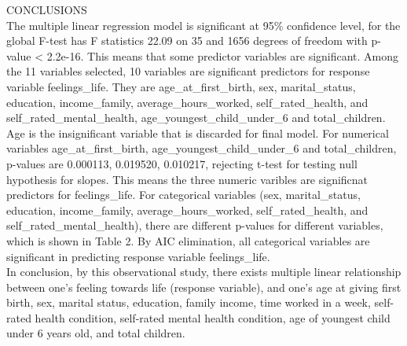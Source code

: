 \documentclass[
]{article}
\begin{document}
CONCLUSIONS\\
The multiple linear regression model is significant at 95\% confidence
level, for the global F-test has F statistics 22.09 on 35 and 1656
degrees of freedom with p-value \textless{} 2.2e-16. This means that
some predictor variables are significant. Among the 11 variables
selected, 10 variables are significant predictors for response variable
feelings\_life. They are age\_at\_first\_birth, sex, marital\_status,
education, income\_family, average\_hours\_worked, self\_rated\_health,
and self\_rated\_mental\_health, age\_youngest\_child\_under\_6 and
total\_children. Age is the insignificant variable that is discarded for
final model. For numerical variables age\_at\_first\_birth,
age\_youngest\_child\_under\_6 and total\_children, p-values are
0.000113, 0.019520, 0.010217, rejecting t-test for testing null
hypothesis for slopes. This means the three numeric varibles are
significnat predictors for feelings\_life. For categorical variables
(sex, marital\_status, education, income\_family,
average\_hours\_worked, self\_rated\_health, and
self\_rated\_mental\_health), there are different p-values for different
variables, which is shown in Table 2. By AIC elimination, all
categorical variables are significant in predicting response variable
feelings\_life.\\
In conclusion, by this observational study, there exists multiple linear
relationship between one's feeling towards life (response variable), and
one's age at giving first birth, sex, marital status, education, family
income, time worked in a week, self-rated health condition, self-rated
mental health condition, age of youngest child under 6 years old, and
total children.\\
\end{document}
